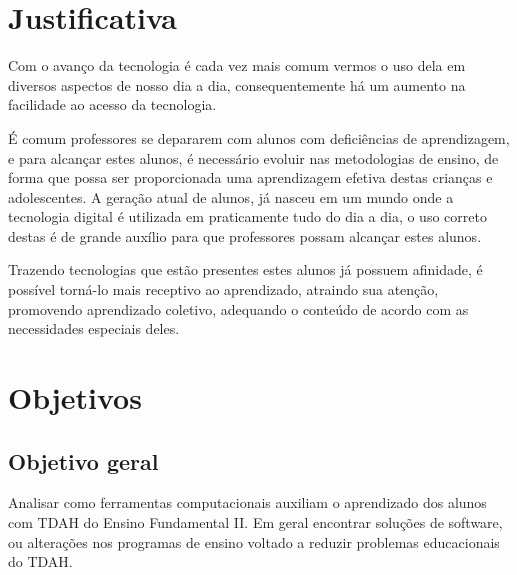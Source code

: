 


\section{Justificativa}

Com o avanço da tecnologia é cada vez mais comum vermos o uso dela em diversos aspectos de nosso dia a dia, consequentemente há um aumento na facilidade ao acesso da tecnologia.

É comum professores se depararem com alunos com deficiências de aprendizagem, e para alcançar estes alunos, é necessário evoluir nas metodologias de ensino, de forma que possa ser proporcionada uma aprendizagem efetiva destas crianças e adolescentes. A geração atual de alunos, já nasceu em um mundo onde a tecnologia digital é utilizada em praticamente tudo do dia a dia, o uso correto destas é de grande auxílio para que professores possam alcançar estes alunos.

Trazendo tecnologias que estão presentes estes alunos já possuem afinidade, é possível torná-lo mais receptivo ao aprendizado, atraindo sua atenção, promovendo aprendizado coletivo, adequando o conteúdo de acordo com as necessidades especiais deles.


\section{Objetivos}
\subsection{Objetivo geral}

Analisar como ferramentas computacionais auxiliam o aprendizado dos alunos com TDAH do Ensino Fundamental II. Em geral encontrar soluções de software, ou alterações nos programas de ensino voltado a reduzir problemas educacionais do TDAH.

